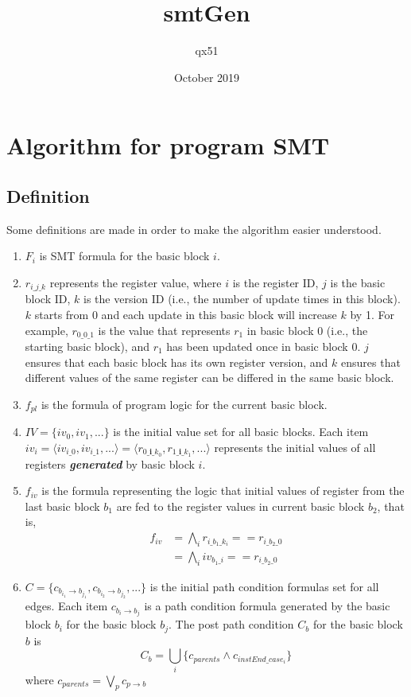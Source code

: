 \documentclass{article}
\title{smtGen}
\author{qx51 }
\date{October 2019}
\begin{document}
\section{Algorithm for program SMT}
\subsection{Definition}

Some definitions are made in order to make the algorithm easier understood.
\begin{enumerate}
\item $F_{i}$ is SMT formula for the basic block $i$.
\item $r_{i\_j\_k}$ represents the register value, where $i$ is the register ID, $j$ is the basic block ID, $k$ is the version ID (i.e., the number of update times in this block). $k$ starts from $0$ and each update in this basic block will increase $k$ by 1. For example, $r_{0\_0\_1}$ is the value that represents $r_1$ in basic block 0 (i.e., the starting basic block), and $r_1$ has been updated once in basic block 0. $j$ ensures that each basic block has its own register version, and $k$ ensures that different values of the same register can be differed in the same basic block.
\item $f_{pl}$ is the formula of program logic for the current basic block.
\item $IV = \{iv_0, iv_1, ... \}$ is the initial value set for all basic blocks. Each item $iv_i = \langle iv_{i\_0}, iv_{i\_1}, ... \rangle = \langle r_{0\_\bm{i}\_k_0}, r_{1\_\bm{i}\_k_1}, ...\rangle$ represents the initial values of all registers \textbf{\textit{generated}} by basic block $i$.

\item $f_{iv}$ is the formula representing the logic that initial values of register from the last basic block $b_1$ are fed to the register values in current basic block $b_2$, that is,
\begin{equation}
\begin{aligned}
f_{iv} &= \bigwedge_{i} r_{i\_b_1\_k_i} == r_{i\_b_2\_0} \\
&= \bigwedge_{i} iv_{b_1\_i} == r_{i\_b_2\_0}
\end{aligned}
\end{equation}
\item $C = \{c_{b_{i_1}\rightarrow b_{j_1}}, c_{b_{i_2}\rightarrow b_{j_2}}, ...\}$ is the initial path condition formulas set for all edges. Each item $c_{b_i\rightarrow b_j}$ is a path condition formula generated by the basic block $b_i$ for the basic block $b_j$.
The post path condition $C_b$ for the basic block $b$ is
\begin{equation}
C_b = \bigcup_i \{c_{parents}\wedge c_{instEnd\_case_i}\}
\end{equation}
where $c_{parents} = \bigvee_{p} c_{p\rightarrow b}$
\end{enumerate}
\end{document}
